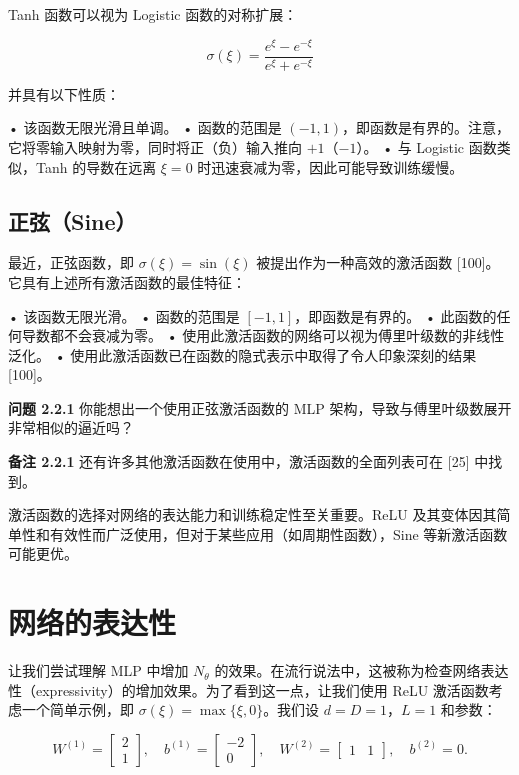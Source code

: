 Tanh 函数可以视为 Logistic 函数的对称扩展：

\[
\sigma(\xi) = \frac{e^\xi - e^{-\xi}}{e^\xi + e^{-\xi}}
\]

并具有以下性质：

• 该函数无限光滑且单调。
• 函数的范围是 $(-1,1)$，即函数是有界的。注意，它将零输入映射为零，同时将正（负）输入推向 $+1$（$-1$）。
• 与 Logistic 函数类似，Tanh 的导数在远离 $\xi=0$ 时迅速衰减为零，因此可能导致训练缓慢。

\subsection{正弦（Sine）}

最近，正弦函数，即 $\sigma(\xi) = \sin(\xi)$ 被提出作为一种高效的激活函数 [100]。它具有上述所有激活函数的最佳特征：

• 该函数无限光滑。
• 函数的范围是 $[-1,1]$，即函数是有界的。
• 此函数的任何导数都不会衰减为零。
• 使用此激活函数的网络可以视为傅里叶级数的非线性泛化。
• 使用此激活函数已在函数的隐式表示中取得了令人印象深刻的结果 [100]。

\textbf{问题 2.2.1} 你能想出一个使用正弦激活函数的 MLP 架构，导致与傅里叶级数展开非常相似的逼近吗？

\textbf{备注 2.2.1} 还有许多其他激活函数在使用中，激活函数的全面列表可在 [25] 中找到。

\begin{mycomment}
激活函数的选择对网络的表达能力和训练稳定性至关重要。ReLU 及其变体因其简单性和有效性而广泛使用，但对于某些应用（如周期性函数），Sine 等新激活函数可能更优。
\end{mycomment}

\section{网络的表达性}

让我们尝试理解 MLP 中增加 $N_\theta$ 的效果。在流行说法中，这被称为检查网络表达性（expressivity）的增加效果。为了看到这一点，让我们使用 ReLU 激活函数考虑一个简单示例，即 $\sigma(\xi) = \max\{\xi, 0\}$。我们设 $d = D = 1$，$L=1$ 和参数：

\[
W^{(1)} = \begin{bmatrix} 2 \\ 1 \end{bmatrix}, \quad b^{(1)} = \begin{bmatrix} -2 \\ 0 \end{bmatrix}, \quad W^{(2)} = \begin{bmatrix} 1 & 1 \end{bmatrix}, \quad b^{(2)} = 0.
\]

